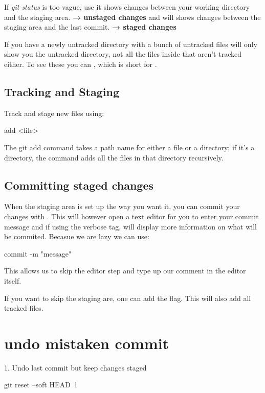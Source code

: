 \noindent If \textit{git status} is too vague, use  it shows changes between your working directory and the staging area. \textbf{→ unstaged changes}\newline
{} and \hspace{1mm}\footnotemark\hspace{0.2mm} will shows changes between the staging area and the last commit.  \textbf{→ staged changes}

If you have a newly untracked directory with a bunch of untracked files  will only show you the untracked directory, not all the files inside that aren't tracked either. To see these you can , which is short for .
\subsection{Tracking and Staging}
\noindent Track and stage new files using:
\begin{gitBashBox}
add <file>
\end{gitBashBox}
\noindent The git add command takes a path name for either a file or a directory; if it’s a directory, the command adds all the files in that directory recursively.

\subsection{Committing staged changes}
When the staging area is set up the way you want it, you can commit your changes with . This will however open a text editor for you to enter your commit message and if using the  verbose tag, will display more information on what will be commited.\newline
Becasue we are lazy we can use:
\begin{gitBashBox}
commit -m "message"
\end{gitBashBox}
This allows us to skip the editor step and type up our comment in the editor itself.\newline

If you want to skip the staging are, one can add the  flag. This will  also add all tracked files.

\section{undo mistaken commit}
1. Undo last commit but keep changes staged
\begin{gitBashBox}
git reset --soft HEAD~1
\end{gitBashBox}

